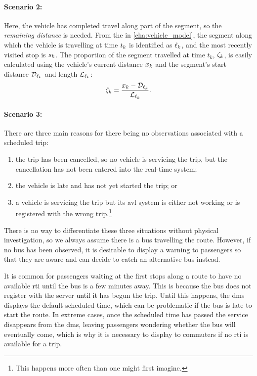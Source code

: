 \paragraph{Scenario 2:}
Here, the vehicle has completed travel along part of the segment, so the \emph{remaining distance} is needed. From the \pf{} in \cref{cha:vehicle_model}, the segment along which the vehicle is travelling at time $t_k$ is identified as $\ell_k$, and the most recently visited stop is $s_k$. The proportion of the segment travelled at time $t_k$, $\zeta_k$, is easily calculated using the vehicle's current distance $x_k$ and the segment's start distance $\mathcal{D}_{\ell_k}$ and length $\mathcal{L}_{\ell_k}$:
\begin{equation}
\label{eq:trip_seg_completed_prop}
\zeta_k = \frac{x_k - \mathcal{D}_{\ell_k}}{\mathcal{L}_{\ell_k}}.
\end{equation}


\paragraph{Scenario 3:}
There are three main reasons for there being no observations associated with a scheduled trip:
\begin{enumerate}
\item the trip has been cancelled, so no vehicle is servicing the trip, but the cancellation has not been entered into the real-time system;
\item the vehicle is late and has not yet started the trip; or
\item a vehicle is servicing the trip but its \gls{avl} system is either not working or is registered with the wrong trip.\footnote{This happens more often than one might first imagine.}
\end{enumerate}
There is no way to differentiate these three situations without physical investigation, so we always assume there is a bus travelling the route. However, if no bus has been observed, it is desirable to display a warning to passengers so that they are aware and can decide to catch an alternative bus instead.


It is common for passengers waiting at the first stops along a route to have no available \gls{rti} until the bus is a few minutes away. This is because the bus does not register with the server until it has begun the trip. Until this happens, the \gls{dms} displays the default scheduled time, which can be problematic if the bus is late to start the route. In extreme cases, once the scheduled time has passed the service disappears from the \gls{dms}, leaving passengers wondering whether the bus will eventually come, which is why it is necessary to display to commuters if no \gls{rti} is available for a trip.



